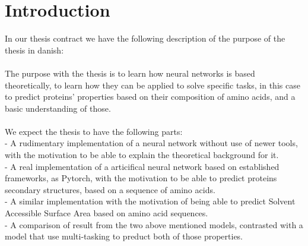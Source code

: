 \section{Introduction}
In our thesis contract we have the following description of the purpose of the thesis in danish:\\\\
The purpose with the thesis is to learn how neural networks is based theoretically, to learn how they can be applied to solve specific tasks, in this case to predict proteins' properties based on their composition of amino acids, and a basic understanding of those. \\\\
We expect the thesis to have the following parts:\\
- A rudimentary implementation of a neural network without use of newer tools, with the motivation to be able to explain the theoretical background for it.\\
- A real implementation of a articifical neural network based on established frameworks, as Pytorch, with the motivation to be able to predict proteins secondary structures, based on a sequence of amino acids. \\
- A similar implementation with the motivation of being able to predict Solvent Accessible Surface Area based on amino acid sequences. \\
- A comparison of result from the two above mentioned models, contrasted with a model that use multi-tasking to preduct both of those properties.\\ 
